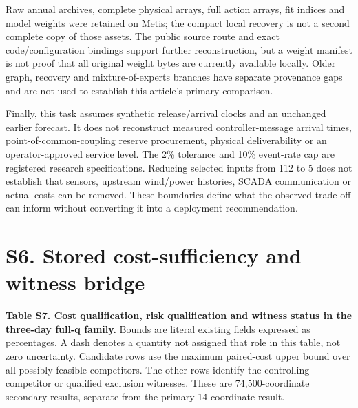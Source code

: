 \documentclass[
  british,
  11pt,
]{article}
\begin{document}
Raw annual archives, complete physical arrays, full action arrays, fit
indices and model weights were retained on Metis; the compact local
recovery is not a second complete copy of those assets. The public
source route and exact code/configuration bindings support further
reconstruction, but a weight manifest is not proof that all original
weight bytes are currently available locally. Older graph, recovery and
mixture-of-experts branches have separate provenance gaps and are not
used to establish this article's primary comparison.

Finally, this task assumes synthetic release/arrival clocks and an
unchanged earlier forecast. It does not reconstruct measured
controller-message arrival times, point-of-common-coupling reserve
procurement, physical deliverability or an operator-approved service
level. The 2\% tolerance and 10\% event-rate cap are registered research
specifications. Reducing selected inputs from 112 to 5 does not
establish that sensors, upstream wind/power histories, SCADA
communication or actual costs can be removed. These boundaries define
what the observed trade-off can inform without converting it into a
deployment recommendation.


\section{S6. Stored cost-sufficiency and witness
bridge}\label{s6.-stored-cost-sufficiency-and-witness-bridge}

\textbf{Table S7. Cost qualification, risk qualification and witness
status in the three-day full-q family.} Bounds are literal existing
fields expressed as percentages. A dash denotes a quantity not assigned
that role in this table, not zero uncertainty. Candidate rows use the
maximum paired-cost upper bound over all possibly feasible competitors.
The other rows identify the controlling competitor or qualified
exclusion witnesses. These are 74,500-coordinate secondary results,
separate from the primary 14-coordinate result.
\end{document}
